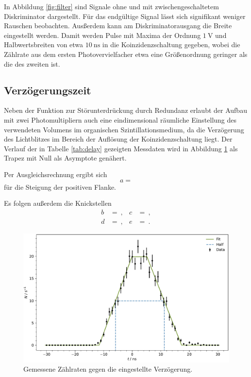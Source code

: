 In Abbildung \ref{fig:filter} sind Signale ohne und mit zwischengeschaltetem Diskriminator dargestellt. Für das endgültige Signal
lässt sich signifikant weniger Rauschen beobachten. Ausßerdem kann am Diskriminatorausgang die Breite eingestellt werden. Damit
werden Pulse mit Maxima der Ordnung $\qty{1}{\volt}$ und Halbwertsbreiten von etwa $\qty{10}{\nano\second}$ in die
Koinzidenzschaltung gegeben, wobei die Zählrate aus dem ersten Photovervielfacher etwa eine Größenordnung geringer als die des
zweiten ist.



\subsection{Verzögerungszeit}

Neben der Funktion zur Störunterdrückung durch Redundanz erlaubt der Aufbau mit zwei Photomultipliern auch eine eindimensional
räumliche Einstellung des verwendeten Volumens im organischen Szintillationsmedium, da die Verzögerung des Lichtblitzes im Bereich
der Auflösung der Koinzidenzschaltung liegt. Der Verlauf der in Tabelle \ref{tab:delay} gezeigten Messdaten wird in Abbildung
\ref{fig:delay} als Trapez mit Null als Asymptote genähert.

Per Ausgleichsrechnung ergibt sich
\begin{equation*}
	a = 
\end{equation*}
für die Steigung der positiven Flanke.

Es folgen außerdem die Knickstellen
\begin{align*}
	b &=  \: , & c &=  \: , \\
	d &=  \: , & e &=  \: .
\end{align*}

\begin{figure}[H]
	\centering
	\includegraphics[width=\textwidth]{build/delay.pdf}
	\caption{Gemessene Zählraten gegen die eingestellte Verzögerung.}
	\label{fig:delay}
\end{figure}

